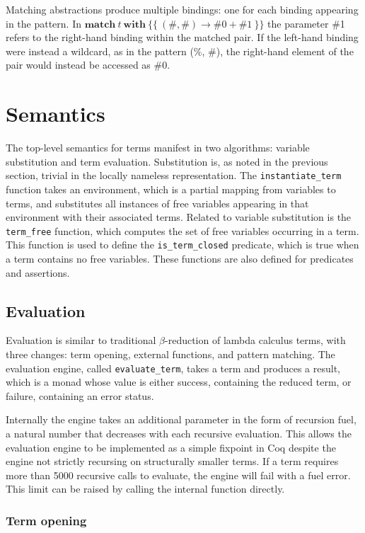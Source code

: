 \documentclass[12pt]{article}
\def\tmatch{\mathbf{match}}
\def\twith{\mathbf{with}}
\def\tcase{\rightarrow}
\newcommand{\TMatch}[2]{\tmatch\ #1\ \twith\ #2}
\newcommand{\TCases}[1]{\{\{\ #1\ \}\}}
\newcommand{\TCase}[2]{#1 \tcase #2}
\begin{document}
Matching abstractions produce multiple bindings: one for each binding
appearing in the pattern. In $\TMatch{t}{\TCases{\TCase{(\#, \#)}{\#0 +
\#1}}}$ the parameter \#1 refers to the right-hand binding within the
matched pair.  If the left-hand binding were instead a wildcard, as in
the pattern (\%, \#), the right-hand element of the pair would instead
be accessed as \#0.

\section{Semantics}

The top-level semantics for terms manifest in two algorithms: variable
substitution and term evaluation.  Substitution is, as noted in the
previous section, trivial in the locally nameless representation.  The
\texttt{instantiate\_term} function takes an environment, which is a
partial mapping from variables to terms, and substitutes all instances
of free variables appearing in that environment with their associated
terms.  Related to variable substitution is the \texttt{term\_free}
function, which computes the set of free variables occurring in a term.
This function is used to define the \texttt{is\_term\_closed} predicate,
which is true when a term contains no free variables.  These functions
are also defined for predicates and assertions.

\subsection{Evaluation}

Evaluation is similar to traditional $\beta$-reduction of lambda
calculus terms, with three changes: term opening, external functions,
and pattern matching.  The evaluation engine, called
\texttt{evaluate\_term}, takes a term and produces a result, which is a
monad whose value is either success, containing the reduced term, or
failure, containing an error status.

Internally the engine takes an additional parameter in the form of
recursion fuel, a natural number that decreases with each recursive
evaluation.  This allows the evaluation engine to be implemented as a
simple fixpoint in Coq despite the engine not strictly recursing on
structurally smaller terms.  If a term requires more than 5000
recursive calls to evaluate, the engine will fail with a fuel error.
This limit can be raised by calling the internal function directly.

\subsubsection{Term opening}
\end{document}
